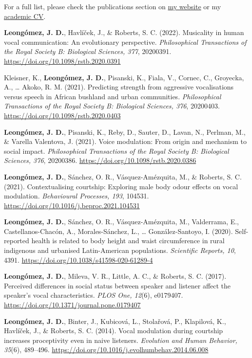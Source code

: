 \documentclass[11pt,a4paper,]{awesome-cv}
\begin{document}
For a full list, please check the publications section on
\href{https://jdleongomez.info/en/publication/}{my website} or my
\href{https://jdleongomez.info/en/files/jdl_cv_en.pdf}{academic CV}.

\begingroup
\setlength{\parindent}{-0.5in}
\setlength{\leftskip}{0.5in}

\textbf{Leongómez, J. D.}, Havlíček, J., \& Roberts, S. C. (2022).
Musicality in human vocal communication: An evolutionary perspective.
\emph{Philosophical Transactions of the Royal Society B: Biological
Sciences, 377}, 20200391. \url{https://doi.org/10.1098/rstb.2020.0391}

Kleisner, K., \textbf{Leongómez, J. D.}, Pisanski, K., Fiala, V.,
Cornec, C., Groyecka, A., \ldots{} Akoko, R. M. (2021). Predicting
strength from aggressive vocalisations versus speech in African bushland
and urban communities. \emph{Philosophical Transactions of the Royal
Society B: Biological Sciences, 376}, 20200403.
\url{https://doi.org/10.1098/rstb.2020.0403}

\textbf{Leongómez, J. D.}, Pisanski, K., Reby, D., Sauter, D., Lavan,
N., Perlman, M., \& Varella Valentova, J. (2021). Voice modulation: From
origin and mechanism to social impact. \emph{Philosophical Transactions
of the Royal Society B: Biological Sciences, 376}, 20200386.
\url{https://doi.org/10.1098/rstb.2020.0386}

\textbf{Leongómez, J. D.}, Sánchez, O. R., Vásquez-Amézquita, M., \&
Roberts, S. C. (2021). Contextualising courtship: Exploring male body
odour effects on vocal modulation. \emph{Behavioural Processes, 193},
104531. \url{https://doi.org/10.1016/j.beproc.2021.104531}

\textbf{Leongómez, J. D.}, Sánchez, O. R., Vásquez-Amézquita, M.,
Valderrama, E., Castellanos-Chacón, A., Morales-Sánchez, L., \ldots{}
González-Santoyo, I. (2020). Self-reported health is related to body
height and waist circumference in rural indigenous and urbanised
Latin-American populations. \emph{Scientific Reports, 10}, 4391.
\url{https://doi.org/10.1038/s41598-020-61289-4}

\textbf{Leongómez, J. D.}, Mileva, V. R., Little, A. C., \& Roberts, S.
C. (2017). Perceived differences in social status between speaker and
listener affect the speaker's vocal characteristics. \emph{PLOS One,
12}(6), e0179407. \url{https://doi.org/10.1371/journal.pone.0179407}

\textbf{Leongómez, J. D.}, Binter, J., Kubicová, L., Stolařová, P.,
Klapilová, K., Havlíček, J., \& Roberts, S. C. (2014). Vocal modulation
during courtship increases proceptivity even in naive listeners.
\emph{Evolution and Human Behavior, 35}(6), 489--496.
\url{https://doi.org/10.1016/j.evolhumbehav.2014.06.008}
\end{document}
